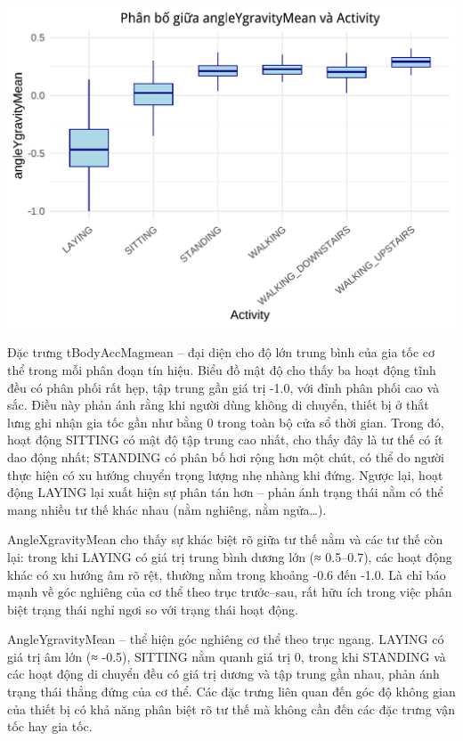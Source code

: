 \documentclass[
]{article}
\begin{document}
\includegraphics{report_files/figure-latex/unnamed-chunk-18-1.pdf}

Đặc trưng tBodyAccMagmean -- đại diện cho độ lớn trung bình của gia tốc
cơ thể trong mỗi phân đoạn tín hiệu. Biểu đồ mật độ cho thấy ba hoạt
động tĩnh đều có phân phối rất hẹp, tập trung gần giá trị -1.0, với đỉnh
phân phối cao và sắc. Điều này phản ánh rằng khi người dùng không di
chuyển, thiết bị ở thắt lưng ghi nhận gia tốc gần như bằng 0 trong toàn
bộ cửa sổ thời gian. Trong đó, hoạt động SITTING có mật độ tập trung cao
nhất, cho thấy đây là tư thế có ít dao động nhất; STANDING có phân bố
hơi rộng hơn một chút, có thể do người thực hiện có xu hướng chuyển
trọng lượng nhẹ nhàng khi đứng. Ngược lại, hoạt động LAYING lại xuất
hiện sự phân tán hơn -- phản ánh trạng thái nằm có thể mang nhiều tư thế
khác nhau (nằm nghiêng, nằm ngửa\ldots).

AngleXgravityMean cho thấy sự khác biệt rõ giữa tư thế nằm và các tư thế
còn lại: trong khi LAYING có giá trị trung bình dương lớn (≈ 0.5--0.7),
các hoạt động khác có xu hướng âm rõ rệt, thường nằm trong khoảng -0.6
đến -1.0. Là chỉ báo mạnh về góc nghiêng của cơ thể theo trục
trước--sau, rất hữu ích trong việc phân biệt trạng thái nghỉ ngơi so với
trạng thái hoạt động.

AngleYgravityMean -- thể hiện góc nghiêng cơ thể theo trục ngang. LAYING
có giá trị âm lớn (≈ -0.5), SITTING nằm quanh giá trị 0, trong khi
STANDING và các hoạt động di chuyển đều có giá trị dương và tập trung
gần nhau, phản ánh trạng thái thẳng đứng của cơ thể. Các đặc trưng liên
quan đến góc độ không gian của thiết bị có khả năng phân biệt rõ tư thế
mà không cần đến các đặc trưng vận tốc hay gia tốc.
\end{document}

